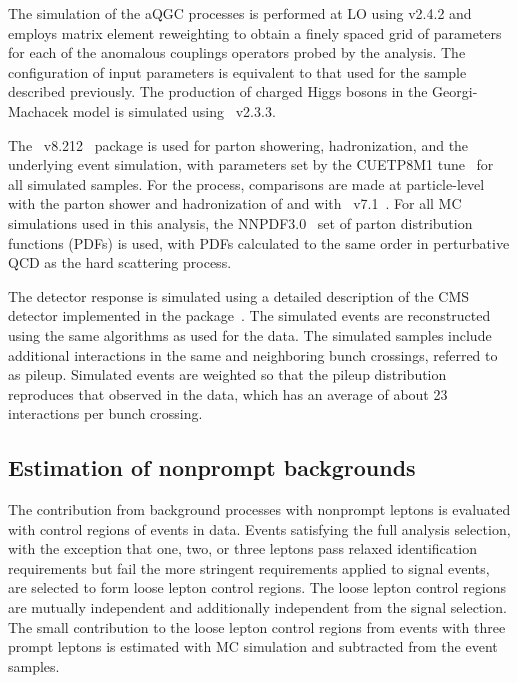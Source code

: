 The simulation of the aQGC processes is performed at LO using \MG v2.4.2 and employs matrix element 
reweighting to obtain a finely spaced grid of parameters for each of the anomalous couplings
operators probed by the analysis. The configuration of input parameters is equivalent to that used for the 
\EWWZ sample described previously. 
The production of charged Higgs bosons in the Georgi-Machacek model
is simulated using \MG~v2.3.3.

The \PYTHIA~v8.212~\cite{Sjostrand:2006za,Sjostrand:2015} package
is used for parton showering, hadronization, and
the underlying event simulation, with parameters set by the CUETP8M1
tune~\cite{Khachatryan:2015pea} for all simulated samples.
For the \EWWZ process, comparisons are made at particle-level with the parton shower
and hadronization 
of \Sherpa and with \Herwig~v7.1~\cite{Bellm:2015jjp,Bahr:2008pv}.
For all MC simulations used in this analysis, the NNPDF3.0~\cite{NNPDF2015} set of
parton distribution functions (PDFs) is used, with PDFs calculated to the same
order in perturbative QCD as the hard scattering process. 

The detector response is simulated using a detailed
description of the CMS detector implemented in the \GEANTfour
package~\cite{GEANT, Geant2}. The simulated events are  reconstructed
using the same algorithms as used for the data. 
The simulated samples include additional interactions in the same and neighboring bunch crossings,
referred to as pileup.
Simulated events are weighted so that the pileup distribution reproduces that observed in 
the data, which has an average of about 23 interactions per bunch
crossing.

\subsection{Estimation of nonprompt backgrounds}

The contribution from background processes with nonprompt leptons is
evaluated with control regions of events in data.
Events satisfying the full analysis selection,
with the exception that one, two, or three leptons pass relaxed identification
requirements but fail the more stringent requirements applied to signal events,
are selected to form loose lepton control regions. The loose lepton control regions are
mutually independent and additionally independent from the signal selection.
The small contribution to the loose lepton control regions from events with three prompt leptons
is estimated with MC simulation and 
subtracted from the event samples.

